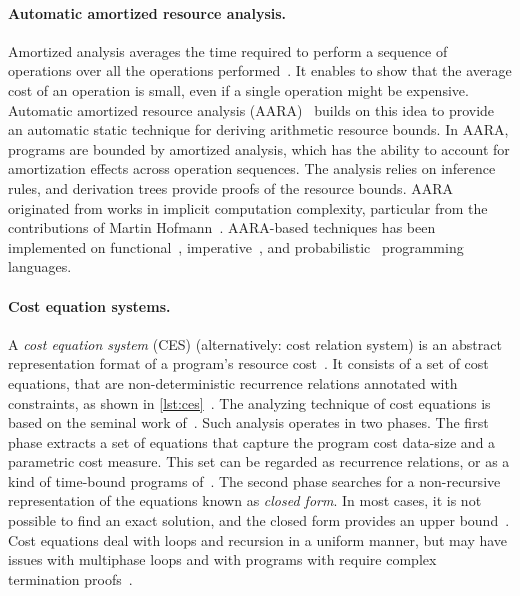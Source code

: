 \paragraph*{Automatic amortized resource analysis.}
Amortized analysis averages the time required to perform a sequence of operations over all the operations performed~\cite[p. 451]{cormen2009}.
It enables to show that the average cost of an operation is small, even if a single operation might be expensive.
Automatic amortized resource analysis (AARA)~\cite{hoffmann2022} builds on this idea to provide an automatic static technique for deriving arithmetic resource bounds.
In AARA, programs are bounded by amortized analysis, which has the ability to account for amortization effects across operation sequences.
The analysis relies on inference rules, and derivation trees provide proofs of the resource bounds.
AARA originated from works in implicit computation complexity, particular from the contributions of Martin Hofmann~\cite{hoffmann2022}.
AARA-based techniques has been implemented on functional~\cite{hoffmann2017}, imperative~\cite{carbonneaux2015,carbonneaux2017}, and probabilistic~\cite{ngo2018} programming languages.

\paragraph*{Cost equation systems.}
A \emph{cost equation system} (CES) (alternatively: cost relation system) is an abstract representation format of a program's resource cost~\cite{floresmontoya2017,albert2019}.
It consists of a set of cost equations, that are non-deterministic recurrence relations annotated with constraints, as shown in \autoref{lst:ces}~\cite{floresmontoya2014}.
The analyzing technique of cost equations is based on the seminal work of~\textcite{wegbreit1975}.
Such analysis operates in two phases.
The first phase extracts a set of equations that capture the program cost \wrt data-size and a parametric cost measure.
This set can be regarded as recurrence relations, or as a kind of time-bound programs of~\textcite{rosendahl1989}.
The second phase searches for a non-recursive representation of the equations known as \emph{closed form}.
In most cases, it is not possible to find an exact solution, and the closed form provides an upper bound~\cite{albert2008}.
Cost equations deal with loops and recursion in a uniform manner,
but may have issues with multiphase loops and with programs with require complex termination proofs~\cite{floresmontoya2014}.

